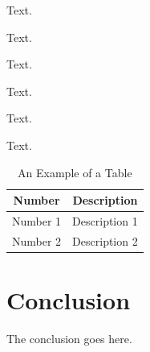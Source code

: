 \documentclass[conference]{IEEEtran}
\begin{document}
Text.

Text.

Text.

Text.

Text.

Text.


%
\begin{table}[!tp]
\caption{An Example of a Table}
\label{table_example}
\centering
\begin{tabular}{c|c}
\hline
\textbf{Number} & \textbf{Description} \\
\hline
Number 1 & Description 1 \\
\hline
Number 2 & Description 2\\
\hline
\end{tabular}
\end{table}






\section{Conclusion}
The conclusion goes here.
\end{document}
